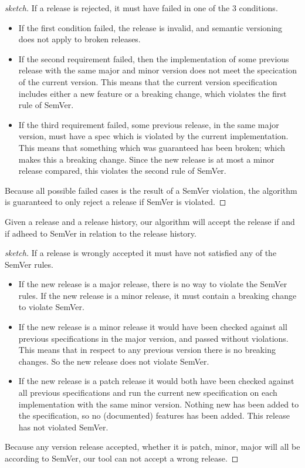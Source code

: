 \begin{proof}[sketch]
If a release is rejected, it must have failed in one of the 3 conditions. 
\begin{itemize}
\item If the first condition failed, the release is invalid, and semantic
  versioning does not apply to broken releases. 
\item If the second requirement failed, then the implementation of
  some previous release with the same major and minor version does
  not meet the specication of the current version. This means that
  the current version specification includes either a new feature
  or a breaking change, which violates the first rule of SemVer.
\item If the third requirement failed, some previous release, in the same
  major version,  must have a spec which is violated by the current
  implementation. This means that something which was guaranteed has been
  broken; which makes this a breaking change. Since the new release is at
  most a minor release compared, this violates the second rule of SemVer.
\end{itemize}
Because all possible failed cases is the result of a SemVer violation, the
algorithm is guaranteed to only reject a release if SemVer is violated.
\end{proof}

\begin{theorem}[Completness]
Given a release and a release history, our algorithm will accept the release if
and if adheed to SemVer in relation to the release history.
\end{theorem}

\begin{proof}[sketch]
If a release is wrongly accepted it must have not satisfied any of the SemVer
rules. 

\begin{itemize}
    \item If the new release is a major release, there is no way to violate the
    SemVer rules. If the new release is a minor release, it must contain a breaking
    change to violate SemVer. 
    \item If the new release is a minor release it would have been checked against all
    previous specifications in the major version, and passed without violations.
    This means that in respect to any previous version there is no breaking
    changes. So the new release does not violate SemVer.\
    \item If the new release is a patch release it would both have been checked against all 
    previous specifications and run the current new specification on each
    implementation with the same minor version. Nothing new has been added to the
    specification, so no (documented) features has been added. This release has not
    violated SemVer.
\end{itemize}

Because any version release accepted, whether it is patch, minor, major will all be according to 
SemVer, our tool can not accept a wrong release.
\end{proof}

